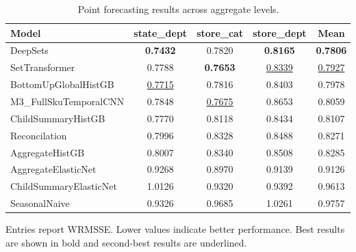 \begin{table}[H]
\centering
\caption{Point forecasting results across aggregate levels.}
\label{tab:main_point}
\begin{threeparttable}
\begin{tabular}{lcccc}
\toprule
Model & state\_dept & store\_cat & store\_dept & Mean \\
\midrule
DeepSets & \textbf{0.7432} & 0.7820 & \textbf{0.8165} & \textbf{0.7806} \\
SetTransformer & 0.7788 & \textbf{0.7653} & \underline{0.8339} & \underline{0.7927} \\
BottomUpGlobalHistGB & \underline{0.7715} & 0.7816 & 0.8403 & 0.7978 \\
M3\_FullSkuTemporalCNN & 0.7848 & \underline{0.7675} & 0.8653 & 0.8059 \\
ChildSummaryHistGB & 0.7770 & 0.8118 & 0.8434 & 0.8107 \\
Reconcilation & 0.7996 & 0.8328 & 0.8488 & 0.8271 \\
AggregateHistGB & 0.8007 & 0.8340 & 0.8508 & 0.8285 \\
AggregateElasticNet & 0.9268 & 0.8970 & 0.9139 & 0.9126 \\
ChildSummaryElasticNet & 1.0126 & 0.9320 & 0.9392 & 0.9613 \\
SeasonalNaive & 0.9326 & 0.9685 & 1.0261 & 0.9757 \\
\bottomrule
\end{tabular}
\begin{tablenotes}
\footnotesize \item Entries report WRMSSE. Lower values indicate better performance. Best results are shown in bold and second-best results are underlined.
\end{tablenotes}
\end{threeparttable}
\end{table}
